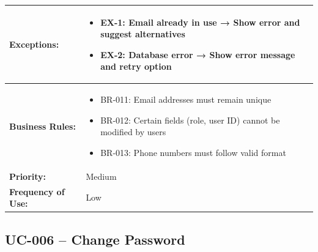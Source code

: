 \documentclass[12pt,a4paper]{article}
\begin{document}
\begin{longtable}{|p{4.5cm}|p{10.5cm}|}
\hline
\textbf{Exceptions:} &
\begin{itemize}
  \item EX-1: Email already in use → Show error and suggest alternatives
  \item EX-2: Database error → Show error message and retry option
\end{itemize} \\
\hline
\textbf{Business Rules:} &
\begin{itemize}
  \item BR-011: Email addresses must remain unique
  \item BR-012: Certain fields (role, user ID) cannot be modified by users
  \item BR-013: Phone numbers must follow valid format
\end{itemize} \\
\hline
\textbf{Priority:} & Medium \\
\hline
\textbf{Frequency of Use:} & Low \\
\hline
\end{longtable}

\subsection{UC-006 – Change Password}
\end{document}
